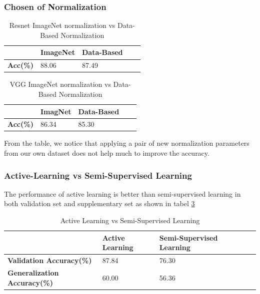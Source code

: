\documentclass[lang=english,inputenc=utf8,fontsize=10pt]{ldvarticle}
\begin{document}
\subsubsection{Chosen of Normalization}
    \begin{table}[H]
    \begin{center}   
    \caption{Resnet ImageNet normalization vs Data-Based Normalization}  
    \label{Resnet normalization} 
    \begin{tabular}{|m{2cm}<{\centering}|m{2cm}<{\centering}|m{2.0cm}<{\centering}|m{2cm}<{\centering}|m{2cm}<{\centering}|}   
    \hline   &\textbf{ImageNet} & \textbf{Data-Based}\\ 
    \hline   \textbf{Acc(\%)}  & 88.06 & 87.49  \\ 
    \hline 
    \end{tabular}   
    \end{center}   
    \end{table}
    
    \begin{table}[H]
    \begin{center}   
    \caption{VGG ImageNet normalization vs Data-Based Normalization}  
    \label{Resnet normalization} 
    \begin{tabular}{|m{2cm}<{\centering}|m{2cm}<{\centering}|m{2.0cm}<{\centering}|m{2cm}<{\centering}|m{2cm}<{\centering}|}   
    \hline   &\textbf{ImagNet} & \textbf{Data-Based}\\ 
    \hline   \textbf{Acc(\%)}  & 86.34 & 85.30  \\ 
    \hline 
    \end{tabular}   
    \end{center}   
    \end{table}
    From the table, we notice that applying a pair of new normalization parameters from our own dataset does not help much to improve the accuracy.\\
\subsubsection{Active-Learning vs Semi-Supervised Learning}
The performance of active learning is better than semi-supervised learning in both validation set and supplementary set as shown in tabel \ref{Active vs Semi}
    \begin{table}[H]
    \begin{center}   
    \caption{Active Learning vs Semi-Supervised Learning}  
    \label{Active vs Semi} 
    \begin{tabular}{|m{2cm}<{\centering}|m{2cm}<{\centering}|m{2.0cm}<{\centering}|m{2cm}<{\centering}|m{2cm}<{\centering}|}   
    \hline   &\textbf{Active Learning} & \textbf{Semi-Supervised Learning}\\ 
    \hline   \textbf{Validation Accuracy(\%)}  & 87.84 & 76.30  \\ 
    \hline   \textbf{Generalization Accuracy(\%)}  & 60.00 & 56.36  \\ 
    \hline 
    \end{tabular}   
    \end{center}   
    \end{table}
\end{document}
